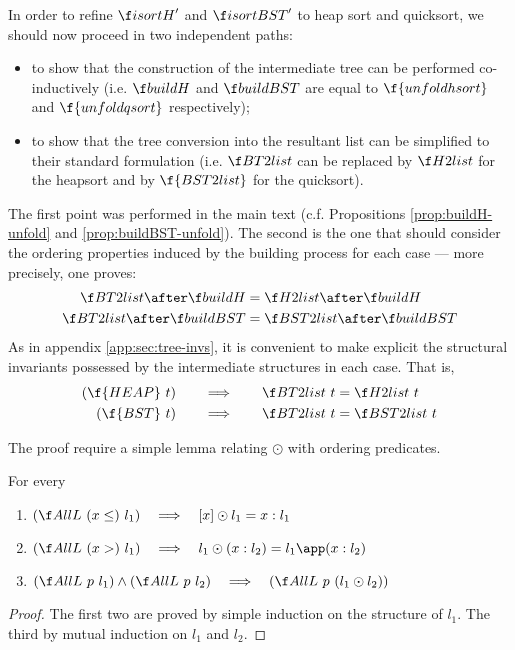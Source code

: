 \documentclass[a4paper,11pt]{llncs}
\begin{document}
\medskip

In order to refine $\isortH'$ and $\isortBST'$ to heap sort and
quicksort, we should now proceed in two independent paths:
\begin{itemize}
\item to show that the construction of the intermediate tree can
  be performed co-inductively (i.e. $\buildH$ and $\buildBST$ are
  equal to $\f{unfoldhsort}$ and $\f{unfoldqsort}$ respectively);
\item to show that the tree conversion into the resultant list can be
  simplified to their standard formulation (i.e. $\BT2list$ can be
  replaced by $\H2list$ for the heapsort and by $\f{BST2list}$ for the
  quicksort).
\end{itemize}

The first point was performed in the main text (c.f. Propositions
\ref{prop:buildH-unfold} and \ref{prop:buildBST-unfold}). The second
is the one that should consider the ordering properties induced by the
building process for each case --- more precisely, one proves:
\begin{align*}
\BT2list \after \buildH & = \H2list \after \buildH \\
\BT2list \after \buildBST & = \BST2list \after \buildBST
\end{align*}
As in appendix \ref{app:sec:tree-invs}, it is convenient to make
explicit the structural invariants possessed by the intermediate
structures in each case. That is,
\begin{align*}
(\f{HEAP}\ t) \qquad\Longrightarrow\qquad \BT2list\ t & = \H2list\ t \\
(\f{BST}\ t) \qquad\Longrightarrow\qquad \BT2list\ t & = \BST2list\ t
\end{align*}

The proof require a simple lemma relating $\odot$ with ordering predicates.

\begin{lemma}
\label{lemma:facts-odot}
  For every
  \begin{enumerate}
\item $(\AllL\ (x\leq)\ l_1) \quad\Longrightarrow\quad [x]\odot l_1 =
    x:l_1 $
\item $(\AllL\ (x>)\ l_1) \quad\Longrightarrow\quad l_1\odot (x:l_2)
    = l_1 \app (x:l_2)$
\item $(\AllL\ p\ l_1) \wedge (\AllL\ p\ l_2)
  \quad\Longrightarrow\quad (\AllL\ p\ (l_1\odot l_2))$
  \end{enumerate}
\end{lemma}
\begin{proof}
  The first two are proved by simple induction on the structure of
  $l_1$. The third by mutual induction on $l_1$ and $l_2$.
\end{proof}
\end{document}

